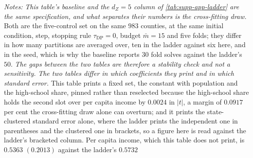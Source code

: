 \documentclass[
  12pt]{article}
\newcommand{\1}[1]{\mathds{1}\left[#1\right]}
\theoremstyle{plain}
\theoremstyle{definition}
\theoremstyle{definition}
\theoremstyle{remark}
\begin{document}
\begin{landscape}
\begingroup
\singlespacing
{}
\label{tab:supp-app-robust}
\footnotesize
\setlength{\tabcolsep}{6pt}
\let\tabular\longtable
\let\endtabular\endlongtable

\addtocounter{table}{-1}
\endgroup
\begingroup\singlespacing\footnotesize
\noindent\textit{Notes:} \emph{This table's baseline and the $d_Z=5$ column of
\cref{tab:supp-app-ladder} are the same specification, and what separates their
numbers is the cross-fitting draw.} Both are the five-control set on the same
$983$ counties, at the same initial condition, step, stopping rule
$\tau_{\mathrm{DP}} = 0$, budget $\bar m = 15$ and five folds; they differ in
how many partitions are averaged over, ten in the ladder against six here, and
in the seed, which is why the baseline reports $30$ fold solves against the
ladder's $50$. \emph{The gaps between the two tables are therefore a stability
check and not a sensitivity.}
\emph{The two tables differ in which coefficients they print and in which
standard error.} This table prints a fixed set, the constant with population and
the high-school share, pinned rather than reselected because the high-school
share holds the second slot over per capita income by $0.0024$ in $|t|$, a
margin of $0.0917$ per cent the cross-fitting draw alone can overturn; and
it prints the state-clustered standard error alone, where the ladder prints the independent
one in parentheses and the clustered one in brackets, so a figure here is read
against the ladder's bracketed column. Per capita income, which
this table does not print, is $0.5363$ $(0.2013)$ against the ladder's $0.5732$

\end{landscape}
\end{document}
